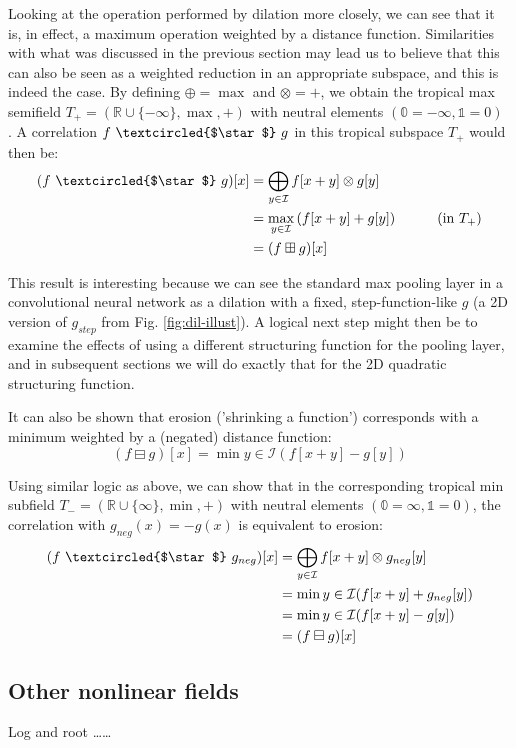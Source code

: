 \documentclass[11pt]{article} %
\def\comment#1{\color{red}#1\color{black}}
\begin{document}
Looking at the operation performed by dilation more closely, we can see that it is, in effect, a maximum operation weighted by a distance function. Similarities with what was discussed in the previous section may lead us to believe that this can also be seen as a weighted reduction in an appropriate subspace, and this is indeed the case. By defining $\oplus=\max$ and $\otimes=+$, we obtain the tropical max semifield $T_+=(\mathbb{R}\cup\{-\infty\},\max,+)$ with neutral elements $(\mathbb{0}=-\infty, \mathbb{1}=0)$ \cite{bellaardaxiomatic}. A correlation $f ~\textcircled{$\star$}~ g$ in this tropical subspace $T_+$ would then be:
\begin{align*}
	(f ~\textcircled{$\star$}~ g)[x]
	&= \bigoplus_{y\in \mathcal{I}}f[x+y] \otimes g[y] \\
	&= \max_{y\in \mathcal{I}}\left(f[x+y] + g[y]\right) \hspace{1cm}\textrm{(in $T_+$)} \\
	&= (f \boxplus g)[x]
\end{align*}

This result is interesting because we can see the standard max pooling layer in a convolutional neural network as a dilation with a fixed, step-function-like $g$ (a 2D version of $g_{step}$ from Fig. \ref{fig:dil-illust}). A logical next step might then be to examine the effects of using a different structuring function for the pooling layer, and in subsequent sections we will do exactly that for the 2D quadratic structuring function.

It can also be shown that erosion ('shrinking a function') corresponds with a minimum weighted by a (negated) distance function: $$(f \boxminus g)[x]=\min{y\in \mathcal{I}}(f[x+y] - g[y])$$ 

Using similar logic as above, we can show that in the corresponding tropical min subfield $T_-=(\mathbb{R}\cup\{\infty\},\min,+)$ with neutral elements $(\mathbb{0}=\infty, \mathbb{1}=0)$, the correlation with $g_{neg}(x)=-g(x)$ is equivalent to erosion:
\begin{align*}
	(f ~\textcircled{$\star$}~ g_{neg})[x]
	&= \bigoplus_{y\in \mathcal{I}}f[x+y] \otimes g_{neg}[y] \\
	&= \min{y\in \mathcal{I}}(f[x+y] + g_{neg}[y]) \\
	&= \min{y\in \mathcal{I}}(f[x+y] - g[y]) \\
	&= (f \boxminus g)[x]
\end{align*}

\subsection{Other nonlinear fields}
Log and root \cite{bellaardaxiomatic} \comment{\ldots\ldots}
\end{document}
